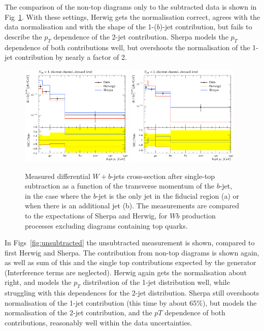 \documentclass[11pt]{cernrep}
\begin{document}
The comparison of the non-top diagrams only to the subtracted data is shown in Fig~\ref{fig:subtracted}. 
With these settings, Herwig gets the normalisation correct, agrees with the data normalisation and with
the shape of the 1-($b$)-jet contribution, but fails to describe the $p_T$ dependence of the 2-jet contribution.
Sherpa models the $p_T$ dependence of both contributions well, but overshoots the normalisation of the 1-jet
contribution by nearly a factor of 2.

\begin{figure}
\centering
	\includegraphics[width=0.48\textwidth]{subtracted_h7_s22-1jet.pdf}
	\includegraphics[width=0.48\textwidth]{subtracted_h7_s22-2jet.pdf}
\caption{\label{fig:subtracted}
  Measured differential $W+b$-jets cross-section after single-top subtraction as a function of the
  transverse momentum of the $b$-jet, in the case where the $b$-jet is the only jet in the fiducial region
  (a) or when there is an additional jet (b). The measurements are compared to the expectations of
  Sherpa and Herwig, for $Wb$ production processes excluding diagrams containing top quarks.}
\end{figure}

In Figs~\ref{fig:unsubtracted} the unsubtracted measurement is shown, compared to first Herwig and Sherpa.
The contribution from non-top diagrams is shown again, as well as sum of this and the single top
contributions expected by the generator (Interference terms are neglected). Herwig again gets the
normalisation about right, and models the $p_T$ distribution of the 1-jet distribution well, while
struggling with this dependences for the 2-jet distribution. Sherpa still overshoots normalisation of
the 1-jet contribution (this time by about 65\%), but models the normalisation of the 2-jet contribution,
and the $pT$ dependence of both contributions, reasonably well within the data uncertainties.
\end{document}
